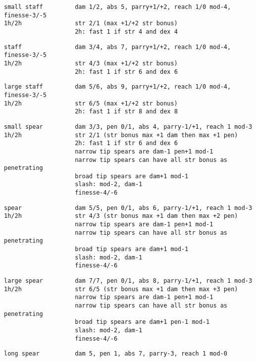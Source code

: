 \begin{samepage}
\begin{verbatim}
small staff         dam 1/2, abs 5, parry+1/+2, reach 1/0 mod-4, finesse-3/-5
1h/2h               str 2/1 (max +1/+2 str bonus)
                    2h: fast 1 if str 4 and dex 4
\end{verbatim} \blocklistgap \begin{verbatim}
staff               dam 3/4, abs 7, parry+1/+2, reach 1/0 mod-4, finesse-3/-5
1h/2h               str 4/3 (max +1/+2 str bonus)
                    2h: fast 1 if str 6 and dex 6
\end{verbatim} \blocklistgap \begin{verbatim}
large staff         dam 5/6, abs 9, parry+1/+2, reach 1/0 mod-4, finesse-3/-5
1h/2h               str 6/5 (max +1/+2 str bonus)
                    2h: fast 1 if str 8 and dex 8
\end{verbatim} \blocklistgap \begin{verbatim}
small spear         dam 3/3, pen 0/1, abs 4, parry-1/+1, reach 1 mod-3
1h/2h               str 2/1 (str bonus max +1 dam then max +1 pen)
                    2h: fast 1 if str 6 and dex 6
                    narrow tip spears are dam-1 pen+1 mod-1
                    narrow tip spears can have all str bonus as penetrating
                    broad tip spears are dam+1 mod-1
                    slash: mod-2, dam-1
                    finesse-4/-6
\end{verbatim} \blocklistgap \begin{verbatim}
spear               dam 5/5, pen 0/1, abs 6, parry-1/+1, reach 1 mod-3
1h/2h               str 4/3 (str bonus max +1 dam then max +2 pen)
                    narrow tip spears are dam-1 pen+1 mod-1
                    narrow tip spears can have all str bonus as penetrating
                    broad tip spears are dam+1 mod-1
                    slash: mod-2, dam-1
                    finesse-4/-6
\end{verbatim} \blocklistgap \begin{verbatim}
large spear         dam 7/7, pen 0/1, abs 8, parry-1/+1, reach 1 mod-3
1h/2h               str 6/5 (str bonus max +1 dam then max +3 pen)
                    narrow tip spears are dam-1 pen+1 mod-1
                    narrow tip spears can have all str bonus as penetrating
                    broad tip spears are dam+1 pen-1 mod-1
                    slash: mod-2, dam-1
                    finesse-4/-6
\end{verbatim} \blocklistgap \begin{verbatim}
long spear          dam 5, pen 1, abs 7, parry-3, reach 1 mod-0

\end{verbatim}
\end{samepage}
